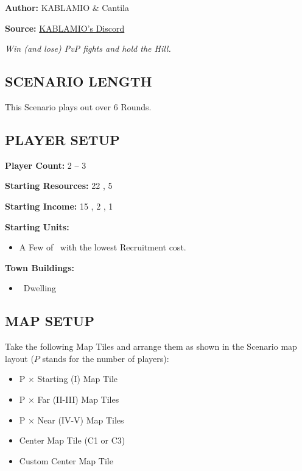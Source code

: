 
\begin{multicols}{2}

\textbf{Author:} KABLAMIO \& Cantila

\textbf{Source:} \href{https://discord.com/channels/1275490124301467799/1284428969369665631}{KABLAMIO's Discord}

\textit{Win (and lose) PvP fights and hold the Hill.}

\subsection*{\MakeUppercase{Scenario Length}}
This Scenario plays out over 6 Rounds.

\subsection*{\MakeUppercase{Player Setup}}
\textbf{Player Count:} 2 -- 3

\textbf{Starting Resources:} 22 , 5 

\textbf{Starting Income:} 15 , 2 , 1 

\textbf{Starting Units:}
\begin{itemize}
  \item A Few of \silver\ with the lowest Recruitment cost.
\end{itemize}

\textbf{Town Buildings:}
\begin{itemize}
  \item \bronze\ Dwelling
\end{itemize}

\subsection*{\MakeUppercase{Map Setup}}
Take the following Map Tiles and arrange them as shown in the Scenario map layout ($P$ stands for the number of players):

\begin{itemize}
  \item P × Starting (I) Map Tile
  \item P × Far (II-III) Map Tiles
  \item P × Near (IV-V) Map Tiles
  \item Center Map Tile (C1 or C3)
  \item Custom Center Map Tile
\end{itemize}


\end{multicols}
